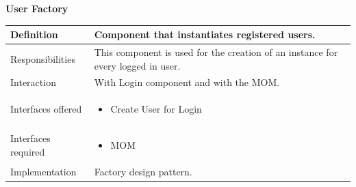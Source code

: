\documentclass{article}
\begin{document}
			\pagebreak	
			\begin{center}
				\centerline{\textbf{User Factory}}	
				\begin{tabular}{| l | p{9cm} |}\hline
					Definition & Component that instantiates registered users.\\\hline
					Responsibilities & This component is used for the creation of an instance for every logged in user.\\\hline
					Interaction & With Login component and with the MOM.\\\hline
					Interfaces offered & \begin{itemize}
						\item Create User for Login
					\end{itemize}\\\hline
					Interfaces required & \begin{itemize}
						\item MOM
					\end{itemize}\\\hline
					Implementation & Factory design pattern.\\\hline
				\end{tabular}
			\end{center}
		
		
			\pagebreak
\end{document}
